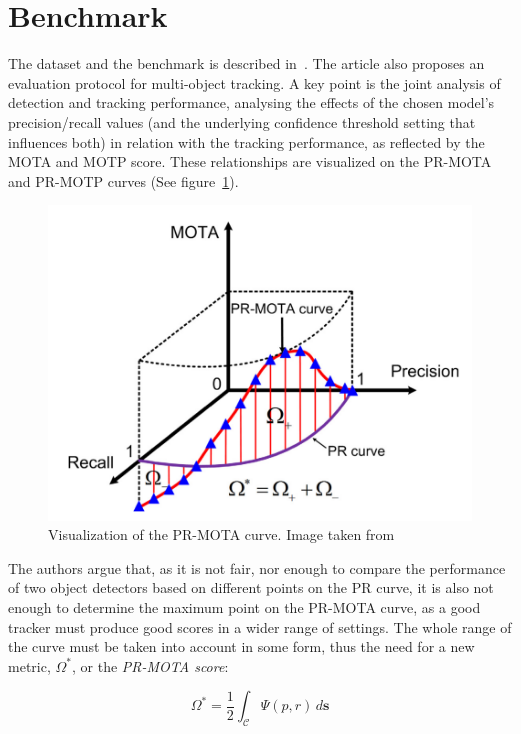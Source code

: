 \section{Benchmark}

The dataset and the benchmark is described in~\cite{CVIU_UA-DETRAC}. The article also proposes an evaluation protocol for multi-object tracking. A key point is the joint analysis of detection and tracking performance, analysing the effects of the chosen model's precision/recall values (and the underlying confidence threshold setting that influences both) in relation with the tracking performance, as reflected by the MOTA and MOTP score. These relationships are visualized on the PR-MOTA and PR-MOTP curves (See figure~\ref{fig:pr-mota}).

\begin{figure}[h]
    \captionsetup{width=\textwidth}
    \includegraphics[width=\textwidth]{figures/pr-mota-curve.png}
    \caption{Visualization of the PR-MOTA curve. Image taken from \cite{CVIU_UA-DETRAC}}
    \label{fig:pr-mota}
\end{figure}

The authors argue that, as it is not fair, nor enough to compare the performance of two object detectors based on different points on the PR curve, it is also not enough to determine the maximum point on the PR-MOTA curve, as a good tracker must produce good scores in a wider range of settings. The whole range of the curve must be taken into account in some form, thus the need for a new metric, $\Omega^{*}$, or the \textit{PR-MOTA score}:

\[ \Omega^{*} = \frac{1}{2}\int_{\mathcal{C}} \Psi(p, r) \,d\textbf{s} \]

